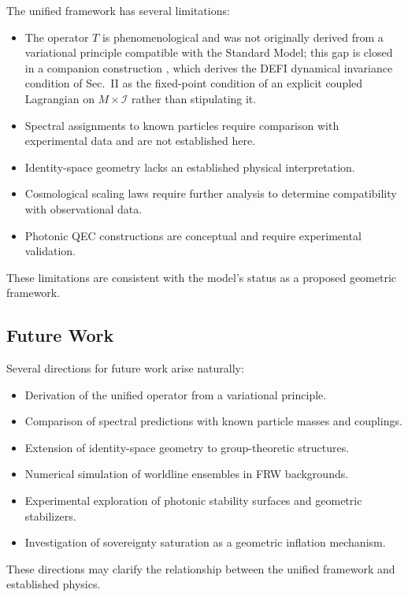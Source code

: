 \documentclass[aip,jmp,reprint,onecolumn,nofootinbib]{revtex4-2}
\begin{document}
The unified framework has several limitations:

\begin{itemize}
\item The operator $T$ is phenomenological and was not originally derived from a variational principle 
compatible with the Standard Model; this gap is closed in a companion construction \cite{DuttonDEFI2026}, 
which derives the DEFI dynamical invariance condition of Sec.~II as the fixed-point condition of an 
explicit coupled Lagrangian on $M\times\mathcal{I}$ rather than stipulating it.
\item Spectral assignments to known particles require comparison with experimental data 
and are not established here.
\item Identity-space geometry lacks an established physical interpretation.
\item Cosmological scaling laws require further analysis to determine compatibility with 
observational data.
\item Photonic QEC constructions are conceptual and require experimental validation.
\end{itemize}

These limitations are consistent with the model’s status as a proposed geometric framework.

\subsection{Future Work}

Several directions for future work arise naturally:

\begin{itemize}
\item Derivation of the unified operator from a variational principle.
\item Comparison of spectral predictions with known particle masses and couplings.
\item Extension of identity-space geometry to group-theoretic structures.
\item Numerical simulation of worldline ensembles in FRW backgrounds.
\item Experimental exploration of photonic stability surfaces and geometric stabilizers.
\item Investigation of sovereignty saturation as a geometric inflation mechanism.
\end{itemize}

These directions may clarify the relationship between the unified framework and established 
physics.
\end{document}
